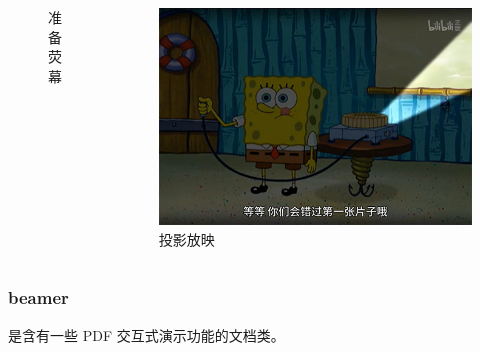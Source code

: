 \begin{shadedsection}
\begin{frame}
\begin{columns}
\begin{column}{0.33\textwidth}
\begin{figure}
\begin{stampbox}[sjtuRedPrimary]
        \end{stampbox}
        \caption{准备荧幕}
      \end{figure}
    \end{column}
    \begin{column}{0.33\textwidth}
      \begin{figure}
        \centering
        \begin{stampbox}[sjtuRedPrimary]
          \scriptsize
          \includegraphics[width=0.88\linewidth]{support/images/project.jpg}
        \end{stampbox}
        \caption{投影放映}
      \end{figure}
    \end{column}
  \end{columns}
\end{frame}

\begin{frame}
  \frametitle{beamer}

   是含有一些 PDF 交互式演示功能的文档类。


\end{frame}
\end{shadedsection}
